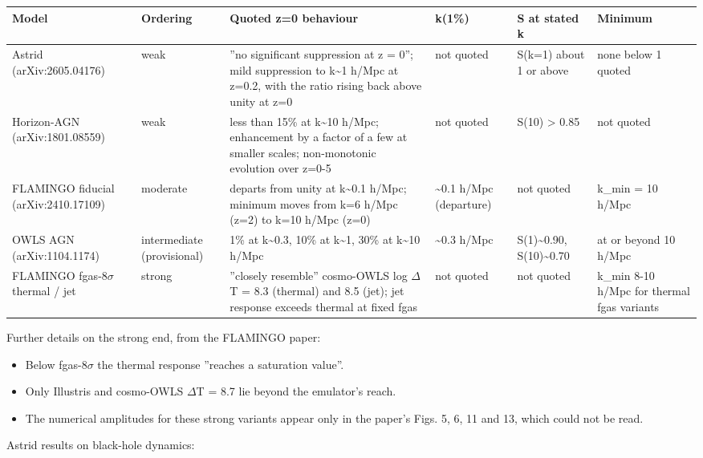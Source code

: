 \documentclass[11pt,a4paper]{article}
\begin{document}
\begin{longtable}{@{}p{}p{}p{}p{}p{}p{}@{}}
\toprule
\textbf{Model} & \textbf{Ordering} & \textbf{Quoted z=0 behaviour} & \textbf{k(1\%)} & \textbf{S at stated k} & \textbf{Minimum} \\ \midrule \endhead
Astrid (arXiv:2605.04176) & weak & ''no significant suppression at z = 0''; mild suppression to k\textasciitilde{}1 h/Mpc at z=0.2, with the ratio rising back above unity at z=0 & not quoted & S(k=1) about 1 or above & none below 1 quoted \\
Horizon-AGN (arXiv:1801.08559) & weak & less than 15\% at k\textasciitilde{}10 h/Mpc; enhancement by a factor of a few at smaller scales; non-monotonic evolution over z=0-5 & not quoted & S(10) \textgreater{} 0.85 & not quoted \\
FLAMINGO fiducial (arXiv:2410.17109) & moderate & departs from unity at k\textasciitilde{}0.1 h/Mpc; minimum moves from k=6 h/Mpc (z=2) to k=10 h/Mpc (z=0) & \textasciitilde{}0.1 h/Mpc (departure) & not quoted & k\_min = 10 h/Mpc \\
OWLS AGN (arXiv:1104.1174) & intermediate (provisional) & 1\% at k\textasciitilde{}0.3, 10\% at k\textasciitilde{}1, 30\% at k\textasciitilde{}10 h/Mpc & \textasciitilde{}0.3 h/Mpc & S(1)\textasciitilde{}0.90, S(10)\textasciitilde{}0.70 & at or beyond 10 h/Mpc \\
FLAMINGO fgas-8$\sigma$ thermal / jet & strong & ''closely resemble'' cosmo-OWLS log $\Delta$T = 8.3 (thermal) and 8.5 (jet); jet response exceeds thermal at fixed fgas & not quoted & not quoted & k\_min 8-10 h/Mpc for thermal fgas variants \\
\bottomrule\end{longtable}
Further details on the strong end, from the FLAMINGO paper:

\begin{itemize}
  \item Below fgas-8$\sigma$ the thermal response ''reaches a saturation value''.
  \item Only Illustris and cosmo-OWLS $\Delta$T = 8.7 lie beyond the emulator's reach.
  \item The numerical amplitudes for these strong variants appear only in the paper's Figs. 5, 6, 11 and 13, which could not be read.
\end{itemize}
Astrid results on black-hole dynamics:
\end{document}
